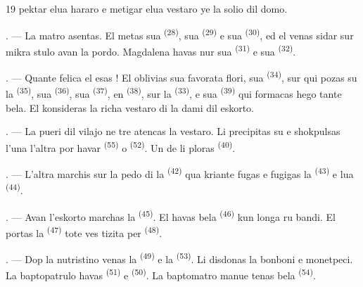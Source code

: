 \begin{VUpage}[21]{19}
\VUcontinue
pektar elua hararo e metigar elua vestaro ye\nl
la solio dil domo.

. --- La matro asentas. El metas sua \cc
{} \textsuperscript{(28)}, sua  \textsuperscript{(29)} e sua  \textsuperscript{(30)},\nl
ed el venas sidar sur mikra stulo avan la pordo.\nl
Magdalena havas nur sua  \textsuperscript{(31)} e sua\nl
{} \textsuperscript{(32)}.

. --- Quante felica el esas ! El oblivias sua\nl
favorata flori, sua  \textsuperscript{(34)}, sur qui pozas su\nl
la  \textsuperscript{(35)}, sua  \textsuperscript{(36)}, sua  \textsuperscript{(37)},\nl
en  \textsuperscript{(38)}, sur la  \textsuperscript{(33)}, e sua  \textsuperscript{(39)} qui\nl
formacas hego tante bela. El konsideras la\nl
richa vestaro di la dami dil eskorto.

. --- La pueri dil vilajo ne tre atencas la\nl
vestaro. Li precipitas su e shokpulsas l'una\nl
l'altra por havar  \textsuperscript{(55)} o  \textsuperscript{(52)}.\nl
Un de li ploras \textsuperscript{(40)}.

. --- L'altra marchis sur la pedo di la\nl
{} \textsuperscript{(42)} qua kriante fugas e fugigas la \cc
{} \textsuperscript{(43)} e lua  \textsuperscript{(44)}.

\VUsaut{5.0mm}
\VUsaut{4.0mm}

. --- Avan l'eskorto marchas la \cc
{} \textsuperscript{(45)}. El havas bela  \textsuperscript{(46)} kun longa ru\cc
bandi. El portas la  \textsuperscript{(47)} tote ves\cc
tizita per  \textsuperscript{(48)}.

. --- Dop la nutristino venas la \cc
{} \textsuperscript{(49)} e la  \textsuperscript{(53)}. Li disdonas la\nl
bonboni e monetpeci. La baptopatrulo havas\nl
{} \textsuperscript{(51)} e  \textsuperscript{(50)}. La baptomatro\nl
manue tenas bela  \textsuperscript{(54)}.
\end{VUpage}

